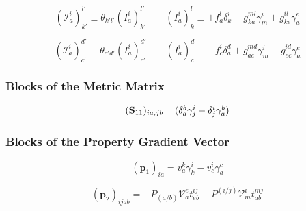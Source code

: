 \begin{subappendices}
    \begin{equation}
        (\mathcal{I}_a^i)_{k'}^{l'}
        \equiv
        \theta_{k'l'}
        (I_a^i)_{k'}^{l'}
        \qquad
        (I_a^i)_k^l
        \equiv
        +
        f_a^l
        \delta_k^i
        -
        \overline{g}_{ka}^{ml}
        \gamma_m^i
        +
        \overline{g}_{ke}^{il}
        \gamma_a^e
    \end{equation}

    \begin{equation}
        (\mathcal{I}_a^i)_{c'}^{d'}
        \equiv
        \theta_{c'd'}
        (I_a^i)_{c'}^{d'}
        \qquad
        (I_a^i)_c^d
        \equiv
        -
        f_c^i
        \delta_a^d
        +
        \overline{g}_{ac}^{md}
        \gamma_m^i
        -
        \overline{g}_{ec}^{id}
        \gamma_a^e
    \end{equation}

    \subsubsection{Blocks of the Metric Matrix}

    \begin{equation}
        \label{eq:s11-odc12}
        \begin{array}{r@{\,}l}
            (\mathbf{S}_{11})_{ia,jb}
            &=
            (
                \delta^b_a
                \gamma^i_j
                -
                \delta^i_j
                \gamma^b_a
            )
        \end{array}
    \end{equation}

    \subsubsection{Blocks of the Property Gradient Vector}

    \begin{equation}
        \label{eq:p1-odc12}
        (\mathbf{p}_1)_{ia}
        =
        v_a^k
        \gamma_k^i
        -
        v_c^i
        \gamma_a^c
    \end{equation}

    \begin{equation}
        (\mathbf{p}_2)_{ijab}
        =
        -
        P_{(a/b)}
        \mathcal{V}_a^e
        t_{eb}^{ij}
        -
        P^{(i/j)}
        \mathcal{V}_m^i
        t_{ab}^{mj}
    \end{equation}


\end{subappendices}
